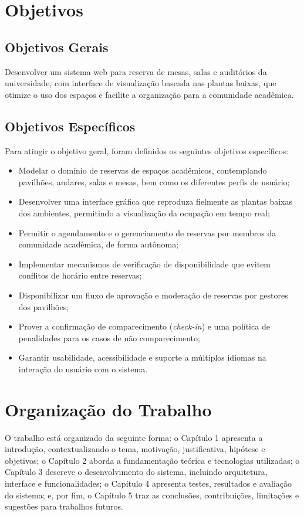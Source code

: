 \section{Objetivos}\label{sec:OBJETIVOS}

\subsection{Objetivos Gerais}\label{sec:OB_GERAIS}
Desenvolver um sistema web para reserva de mesas, salas e auditórios da universidade, com interface de visualização baseada nas plantas baixas, que otimize o uso dos espaços e facilite a organização para a comunidade acadêmica.

\subsection{Objetivos Específicos}\label{sec:OB_Específicos}
Para atingir o objetivo geral, foram definidos os seguintes objetivos específicos:

\begin{itemize}
\item Modelar o domínio de reservas de espaços acadêmicos, contemplando pavilhões, andares, salas e mesas, bem como os diferentes perfis de usuário;
\item Desenvolver uma interface gráfica que reproduza fielmente as plantas baixas dos ambientes, permitindo a visualização da ocupação em tempo real;
\item Permitir o agendamento e o gerenciamento de reservas por membros da comunidade acadêmica, de forma autônoma;
\item Implementar mecanismos de verificação de disponibilidade que evitem conflitos de horário entre reservas;
\item Disponibilizar um fluxo de aprovação e moderação de reservas por gestores dos pavilhões;
\item Prover a confirmação de comparecimento (\textit{check-in}) e uma política de penalidades para os casos de não comparecimento;
\item Garantir usabilidade, acessibilidade e suporte a múltiplos idiomas na interação do usuário com o sistema.
\end{itemize}

\section{Organização do Trabalho}\label{sec:ORGANIZA}

O trabalho está organizado da seguinte forma: o Capítulo 1 apresenta a introdução, contextualizando o tema, motivação, justificativa, hipótese e objetivos; o Capítulo 2 aborda a fundamentação teórica e tecnologias utilizadas; o Capítulo 3 descreve o desenvolvimento do sistema, incluindo arquitetura, interface e funcionalidades; o Capítulo 4 apresenta testes, resultados e avaliação do sistema; e, por fim, o Capítulo 5 traz as conclusões, contribuições, limitações e sugestões para trabalhos futuros.

\pagebreak